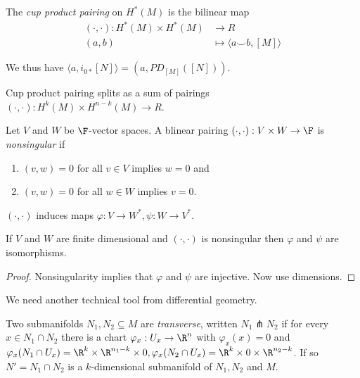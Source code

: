 \documentclass[a4paper]{article}
\newcommand*{\cp}{\smile} %
\begin{document}
\begin{definition}
  The \emph{cup product pairing} on \(H^*(M)\) is the bilinear map
  \begin{align*}
    (\cdot, \cdot): H^*(M) \times H^*(M) &\to R \\
    (a, b) &\mapsto \langle a \cp b, [M] \rangle
  \end{align*}
\end{definition}
We thus have \(\langle a, i_{0*}[N] \rangle = (a, PD_{[M]}([N]))\).

\begin{remark}
  Cup product pairing splits as a sum of pairings \((\cdot, \cdot): H^k(M) \times H^{n - k}(M) \to R\).
\end{remark}

\begin{definition}
  Let \(V\) and \(W\) be \(\F\)-vector spaces. A blinear pairing \((\cdot, \cdot): V \times W \to \F\) is \emph{nonsingular} if
  \begin{enumerate}
  \item \((v, w) = 0\) for all \(v \in V\) implies \(w = 0\) and
  \item \((v, w) = 0\) for all \(w \in W\) implies \(v = 0\). 
  \end{enumerate}

  \((\cdot, \cdot)\) induces maps \(\varphi: V \to W^*, \psi: W \to V^*\).
\end{definition}

\begin{lemma}
  If \(V\) and \(W\) are finite dimensional and \((\cdot, \cdot)\) is nonsingular then \(\varphi\) and \(\psi\) are isomorphisms.
\end{lemma}

\begin{proof}
  Nonsingularity implies that \(\varphi\) and \(\psi\) are injective. Now use dimensions.
\end{proof}

We need another technical tool from differential geometry.

\begin{definition}[transverse]
  Two submanifolds \(N_1, N_2 \subseteq M\) are \emph{transverse}, written \(N_1 \pitchfork N_2\) if for every \(x \in N_1 \cap N_2\) there is a chart \(\varphi_x: U_x \to \R^n\) with \(\varphi_x(x) = 0\) and \(\varphi_x(N_1 \cap U_x) = \R^k \times \R^{n_1 - k} \times 0, \varphi_x(N_2 \cap U_x) = \R^k \times 0 \times \R^{n_2 - k}\). If so \(N' = N_1 \cap N_2\) is a \(k\)-dimensional submanifold of \(N_1, N_2\) and \(M\).
\end{definition}
\end{document}
